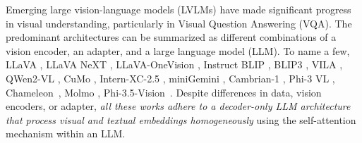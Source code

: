 Emerging large vision-language models (LVLMs) have made significant progress in visual understanding, particularly in Visual Question Answering (VQA).
The predominant architectures can be summarized as different combinations of a vision encoder, an adapter, and a large language model (LLM).
To name a few, LLaVA \citep{llava}, LLaVA NeXT \citep{llava_next}, LLaVA-OneVision \citep{llava_onevision}, Instruct BLIP \citep{dai2023instructblip}, BLIP3 \citep{blip3}, VILA \citep{lin2024vila}, QWen2-VL \citep{wang2024qwen2}, CuMo \citep{li2024cumo}, Intern-XC-2.5 \citep{zhang2024internlm}, miniGemini \citep{li2024mini}, Cambrian-1 \citep{tong2024cambrian}, Phi-3 VL \citep{abdin2024phi}, Chameleon~\citep{team2024chameleon}, Molmo \citep{deitke2024molmo}, Phi-3.5-Vision~\citep{abdin2024phi}.
Despite differences in data, vision encoders, or adapter, \textit{all these works adhere to a decoder-only LLM architecture that process visual and textual embeddings homogeneously} using the self-attention mechanism \citep{vaswani2017attention} within an LLM.

